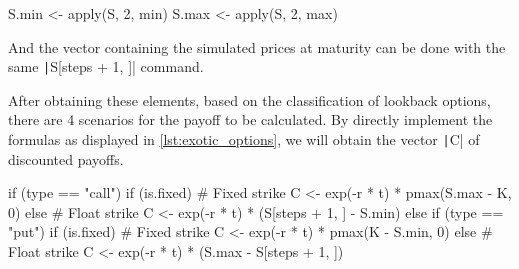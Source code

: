 \begin{Rminted}
S.min <- apply(S, 2, min)
S.max <- apply(S, 2, max)
\end{Rminted}

And the vector containing the simulated prices at maturity can be done with the same \texttt|S[steps + 1, ]| command.

After obtaining these elements, based on the classification of lookback options, there are 4 scenarios for the payoff to be calculated. By directly implement the formulas as displayed in \ref{lst:exotic_options}, we will obtain the vector \texttt|C| of discounted payoffs.

\begin{Rminted}
if (type == "call") {
    if (is.fixed) { # Fixed strike
        C <- exp(-r * t) * pmax(S.max - K, 0)
    } else { # Float strike
        C <- exp(-r * t) * (S[steps + 1, ] - S.min)
    }
} else if (type == "put") {
    if (is.fixed) { # Fixed strike
        C <- exp(-r * t) * pmax(K - S.min, 0)
    } else { # Float strike
        C <- exp(-r * t) * (S.max - S[steps + 1, ])
    }
}
\end{Rminted}

\newpage